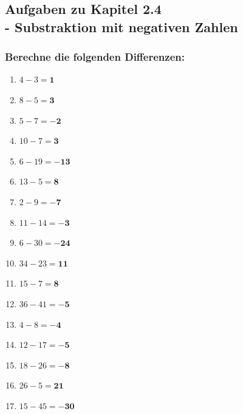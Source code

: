 \documentclass[a4paper,12pt]{article} %
\begin{document}
\subsection{Aufgaben zu Kapitel 2.4 \\
  - Substraktion mit negativen Zahlen}

\subsubsection{Berechne die folgenden Differenzen:}

\begin{enumerate} %

  \item \(4 - 3 = \mathbf{1}\) %

  \item \(8 - 5 = \mathbf{3}\) %

  \item \(5 - 7 = \mathbf{-2}\) %

  \item \(10 - 7 = \mathbf{3}\) %

  \item \(6 - 19 = \mathbf{-13}\) %

  \item \(13 - 5 = \mathbf{8}\) %

  \item \(2 - 9 = \mathbf{-7}\) %

  \item \(11 - 14 = \mathbf{-3}\) %

  \item \(6 - 30 = \mathbf{-24}\) %

  \item \(34 - 23 = \mathbf{11}\) %

  \item \(15 - 7 = \mathbf{8}\) %

  \item \(36 - 41 = \mathbf{-5}\) %

  \item \(4 - 8 = \mathbf{-4}\) %

  \item \(12 - 17 = \mathbf{-5}\) %

  \item \(18 - 26 = \mathbf{-8}\) %

  \item \(26 - 5 = \mathbf{21}\) %

  \item \(15 - 45 = \mathbf{-30}\) %


\end{enumerate}
\end{document}
